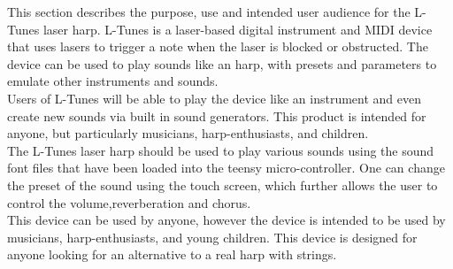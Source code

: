 This section describes the purpose, use and intended user audience for the L-Tunes laser harp. L-Tunes is a laser-based digital instrument and MIDI device that uses lasers to trigger a note when the laser is blocked or obstructed. The device can be used to play sounds like an harp, with presets and parameters to emulate other instruments and sounds. \\  
Users of L-Tunes will be able to play the device like an instrument and even create new sounds via built in sound generators.  This product is intended for anyone, but particularly musicians, harp-enthusiasts, and children.\\
The L-Tunes laser harp should be used to play various sounds using the sound font files that have been loaded into the teensy micro-controller. One can change the preset of the sound using the touch screen, which further allows the user to control the volume,reverberation and chorus.  \\
This device can be used by anyone, however the device is intended to be used by musicians, harp-enthusiasts, and young children. This device is designed for anyone looking for an alternative to a real harp with strings.

